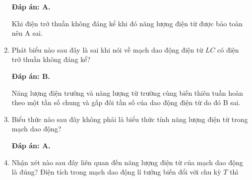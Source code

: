 \begin{enumerate}[label=\bfseries Câu \arabic*:]
	\hideall
	{		\textbf{Đáp án: A.}
		
	Khi điện trở thuần không đáng kể khi đó năng lượng điện từ được bảo toàn nên A sai.
		
	}
		\item {}
	
	{
		Phát biểu nào sau đây là sai khi nói về mạch dao động điện từ $LC$ có điện trở thuần không đáng kể?
		
	}
	
	\hideall
	{		\textbf{Đáp án: B.}
		
		Năng lượng điện trường và năng lượng từ trường cùng biến thiên tuần hoàn theo một tần số chung và gấp đôi tần số của dao động điện từ do đó B sai. 
		
	}
		\item {}
	
	{
		Biểu thức nào sau đây không phải là biểu thức tính năng lượng điện từ trong mạch dao động?
	}
	
	\hideall
	{		\textbf{Đáp án: A.}
		
		
		
	}
		\item {}
	
	{Nhận xét nào sau đây liên quan đến năng lượng điện từ của mạch dao động là đúng? Điện tích trong mạch dao động lí tưởng biến đổi với chu kỳ $T$ thì
		
}
\end{enumerate}
